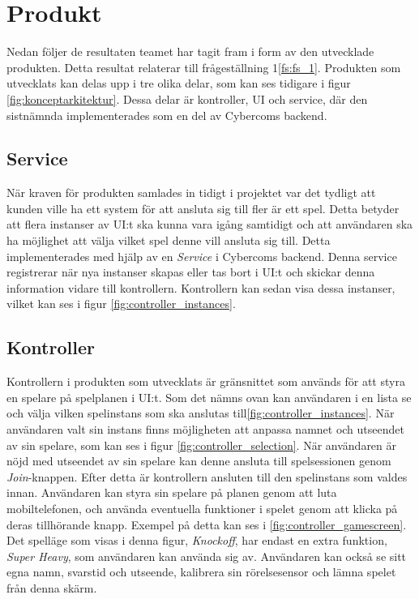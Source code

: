 \section{Produkt}
Nedan följer de resultaten teamet har tagit fram i form av den utvecklade produkten. Detta resultat relaterar till frågeställning 1\ref{fs:fs_1}. Produkten som utvecklats kan delas upp i tre olika delar, som kan ses tidigare i figur \ref{fig:konceptarkitektur}. Dessa delar är kontroller, UI och service, där den sistnämnda implementerades som en del av Cybercoms backend.


\subsection{Service}
När kraven för produkten samlades in tidigt i projektet var det tydligt att kunden ville ha ett system för att ansluta sig till fler är ett spel. Detta betyder att flera instanser av UI:t ska kunna vara igång samtidigt och att användaren ska ha möjlighet att välja vilket spel denne vill ansluta sig till. Detta implementerades med hjälp av en \textit{Service} i Cybercoms backend. Denna service registrerar när nya instanser skapas eller tas bort i UI:t och skickar denna information vidare till kontrollern. Kontrollern kan sedan visa dessa instanser, vilket kan ses i figur \ref{fig:controller_instances}.

\subsection{Kontroller}
Kontrollern i produkten som utvecklats är gränsnittet som används för att styra en spelare på spelplanen i UI:t. Som det nämns ovan kan användaren i en lista se och välja vilken spelinstans som ska anslutas till\ref{fig:controller_instances}. När användaren valt sin instans finns möjligheten att anpassa namnet och utseendet av sin spelare, som kan ses i figur \ref{fig:controller_selection}. När användaren är nöjd med utseendet av sin spelare kan denne ansluta till spelsessionen genom \textit{Join}-knappen. Efter detta är kontrollern ansluten till den spelinstans som valdes innan. Användaren kan styra sin spelare på planen genom att luta mobiltelefonen, och använda eventuella funktioner i spelet genom att klicka på deras tillhörande knapp. Exempel på detta kan ses i \ref{fig:controller_gamescreen}. Det spelläge som visas i denna figur, \textit{Knockoff}, har endast en extra funktion, \textit{Super Heavy}, som användaren kan använda sig av. Användaren kan också se sitt egna namn, svarstid och utseende, kalibrera sin rörelsesensor och lämna spelet från denna skärm. 


